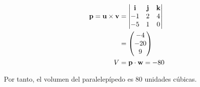 \begin{prob}
\begin{myproof}
\begin{multicols}{2}
\begin{align*}
{\bf p} = {\bf u} \times {\bf v} &=
\begin{vmatrix}
\mathbf{i} & \mathbf{j} & \mathbf{k} \\
-1 & 2 & 4 \\
-5 & 1 & 0 \\
\end{vmatrix} \\
&= \begin{pmatrix} -4 \\ -20 \\ 9 \end{pmatrix}\\
V &= {\bf p} \cdot {\bf w} = -80
\end{align*}

Por tanto, el volumen del paralelepípedo es $80$ unidades cúbicas.

\end{multicols}
\end{myproof}	
\end{prob}

